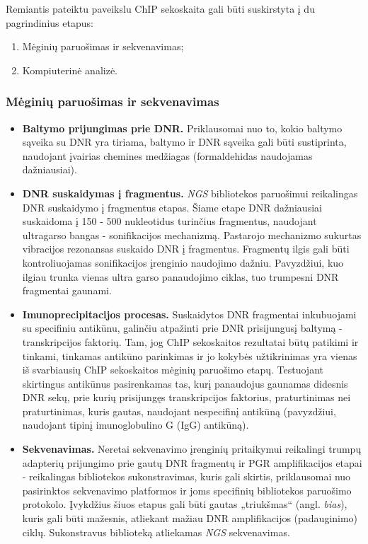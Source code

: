 \documentclass[12pt]{article}
\begin{document}
Remiantis pateiktu paveikslu ChIP sekoskaita gali būti suskirstyta į du
pagrindinius etapus:

\begin{enumerate}
    \item Mėginių paruošimas ir sekvenavimas;
    \item Kompiuterinė analizė.
\end{enumerate}

\newpage

\subsubsection{Mėginių paruošimas ir sekvenavimas}
\begin{itemize}
    \item \textbf{Baltymo prijungimas prie DNR.} Priklausomai nuo to, kokio
        baltymo sąveika su DNR yra tiriama, baltymo ir DNR sąveika gali būti
        sustiprinta, naudojant įvairias chemines medžiagas (formaldehidas
        naudojamas dažniausiai).
    \item \textbf{DNR suskaidymas į fragmentus.} \emph{NGS} bibliotekos 
        paruošimui reikalingas DNR suskaidymo į fragmentus etapas. Šiame etape
        DNR dažniausiai suskaidoma į 150 - 500 nukleotidus turinčius fragmentus,
        naudojant ultragarso bangas - sonifikacijos mechanizmą. Pastarojo
        mechanizmo sukurtas vibracijos rezonansas suskaido DNR į fragmentus.
        Fragmentų ilgis gali būti kontroliuojamas sonifikacijos įrenginio
        naudojimo dažniu. Pavyzdžiui, kuo ilgiau trunka vienas ultra garso
        panaudojimo ciklas, tuo trumpesni DNR fragmentai
        gaunami\cite{SONICATION}.
    \item \textbf{Imunoprecipitacijos procesas.} Suskaidytos DNR fragmentai
        inkubuojami su specifiniu antikūnu, galinčiu atpažinti prie DNR
        prisijungusį baltymą - transkripcijos faktorių. Tam, jog ChIP
        sekoskaitos rezultatai būtų patikimi ir tinkami, tinkamas antikūno
        parinkimas ir jo kokybės užtikrinimas yra vienas iš svarbiausių ChIP
        sekoskaitos mėginių paruošimo etapų\cite{ARTICLE3}. Testuojant
        skirtingus antikūnus pasirenkamas tas, kurį panaudojus gaunamas
        didesnis DNR sekų, prie kurių prisijungęs transkripcijos faktorius,
        praturtinimas nei praturtinimas, kuris gautas, naudojant nespecifinį
        antikūną\cite{ARTICLE4} (pavyzdžiui, naudojant tipinį imunoglobulino G
        (IgG) antikūną).
    \item \textbf{Sekvenavimas.} Neretai sekvenavimo įrenginių pritaikymui
        reikalingi trumpų adapterių prijungimo prie gautų DNR fragmentų ir PGR
        amplifikacijos etapai - reikalingas bibliotekos sukonstravimas, kuris
        gali skirtis, priklausomai nuo pasirinktos sekvenavimo platformos
        ir joms specifinių bibliotekos paruošimo protokolo\cite{ARTICLE5}.
        Įvykdžius šiuos etapus gali būti gautas „triukšmas“\cite{ARTICLE4}
        (angl. \emph{bias}), kuris gali būti mažesnis, atliekant mažiau DNR
        amplifikacijos (padauginimo) ciklų. Sukonstravus biblioteką atliekamas
        \emph{NGS} sekvenavimas.
        
\end{itemize}
\end{document}
